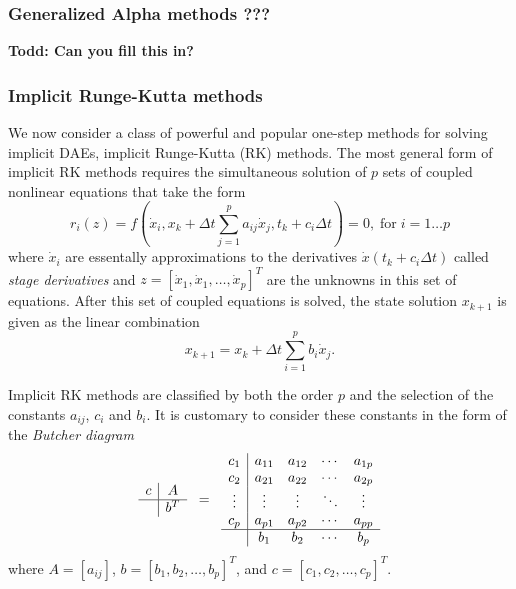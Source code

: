 \documentclass[pdf,ps2pdf,11pt]{SANDreport}
\begin{document}
\subsubsection{Generalized Alpha methods ???}

{}\textbf{Todd: Can you fill this in?}

\subsubsection{Implicit Runge-Kutta methods}

We now consider a class of powerful and popular one-step methods for solving
implicit DAEs, implicit Runge-Kutta (RK) methods.  The most general form
of implicit RK methods requires the simultaneous solution of $p$ sets
of coupled nonlinear equations that take the form
%
\begin{equation}
r_i(z) = f\left( \dot{x}_i, x_k + \Delta t \sum_{j=1}^{p} a_{ij} \dot{x}_j,
t_k + c_i \Delta t \right) = 0,
\; \mbox{for} \; i = 1 \ldots p
\label{rythmos:eqn:irk_dae_ne}
\end{equation}
%
where $\dot{x}_i$ are essentally approximations to the derivatives
$\dot{x}(t_k + c_i \Delta t)$ called {}\textit{stage derivatives} and $z = [
{}\dot{x}_1, {}\dot{x}_1, {}\ldots, {}\dot{x}_p ]^T$ are the unknowns in this
set of equations.  After this set of coupled equations is solved, the state
solution $x_{k+1}$ is given as the linear combination
%
\begin{equation}
x_{k+1} = x_k + \Delta t \sum_{i=1}^{p} b_i \dot{x}_j.
\end{equation}

Implicit RK methods are classified by both the order $p$ and the selection of
the constants $a_{ij}$, $c_i$ and $b_i$.  It is customary to consider these
constants in the form of the {}\textit{Butcher diagram}
%
\[
\begin{array}{c|c}
c & A \\
\hline
  & b^T
\end{array}
\; \; = \; \;
\begin{array}{c|cccc}
c_1 & a_{11} & a_{12} & \cdots & a_{1p} \\
c_2 & a_{21} & a_{22} & \cdots & a_{2p} \\
\vdots & \vdots & \vdots & \ddots & \vdots \\
c_p & a_{p1} & a_{p2} & \cdots & a_{pp} \\
\hline
 & b_1 & b_2 & \cdots & b_p
\end{array}
\]
%
where $A = [a_{ij}]$, $b = [b_1, b_2, {}\ldots, b_p]^T$, and $c =
[c_1, c_2, {}\ldots, c_p]^T$.
\end{document}
